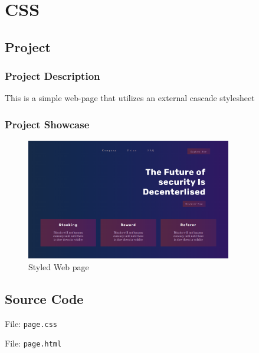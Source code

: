 \section{CSS}\label{sec:css}

\subsection{Project}

\subsubsection*{Project Description}

This is a simple web-page that utilizes an external cascade stylesheet

\subsubsection*{Project Showcase}

\begin{figure}[H]
    \centering
    \includegraphics[width=0.8\textwidth]{res/styled-page.png}
    \caption{Styled Web page}
    \label{fig:css-page}
\end{figure}

\subsection{Source Code}

File: \texttt{page.css}





File: \texttt{page.html}


